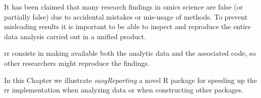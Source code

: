 


It has been claimed that many research findings in omics science are false (or partially false) due to accidental mistakes or mis-usage of methods.
To prevent misleading results it is important to be able to inspect and reproduce the entire data analysis carried out in a unified product.

\gls{rr} consists in making available both the analytic data and the associated code, so other researchers might reproduce the findings. 

In this Chapter we illustrate \textit{easyReporting} a novel R package for speeding up the \gls{rr} implementation when analyzing data or when constructing other packages.